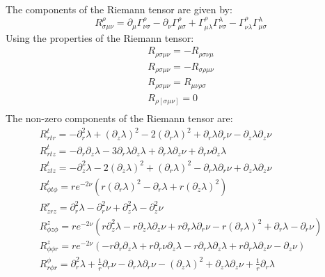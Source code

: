 \documentclass{article}
\begin{document}
The components of the Riemann tensor are given by:
\begin{equation}
R_{\sigma\mu\nu}^{\rho}=\partial_{\mu}\Gamma_{\nu\sigma}^{\rho}-\partial_{\nu}\Gamma_{\mu\sigma}^{\rho}+\Gamma_{\mu\lambda}^{\rho}\Gamma_{\nu\sigma}^{\lambda}-\Gamma_{\nu\lambda}^{\rho}\Gamma_{\mu\sigma}^{\lambda}
\end{equation}
Using the properties of the Riemann tensor:
\begin{equation}
\begin{array}{l}
R_{\rho\sigma\mu\nu}=-R_{\rho\sigma\nu\mu}\\
R_{\rho\sigma\mu\nu}=-R_{\sigma\rho\mu\nu}\\
R_{\rho\sigma\mu\nu}=R_{\mu\nu\rho\sigma}\\
R_{\rho[\sigma\mu\nu]}=0\\
\end{array}
\end{equation}
The non-zero components of the Riemann tensor are:
\begin{equation}
\begin{array}{l}
R^{t}_{rtr}=-\partial^{2}_{r}\lambda+\left(\partial_{z}\lambda\right)^{2}-2\left(\partial_{r}\lambda\right)^{2}+\partial_{r}\lambda\partial_{r}\nu-\partial_{z}\lambda\partial_{z}\nu\\
R^{t}_{rtz}=-\partial_{r}\partial_{z}\lambda-3\partial_{r}\lambda\partial_{z}\lambda+\partial_{r}\lambda\partial_{z}\nu+\partial_{r}\nu\partial_{z}\lambda\\
R^{t}_{ztz}=-\partial^{2}_{z}\lambda-2\left(\partial_{z}\lambda\right)^{2}+\left(\partial_{r}\lambda\right)^{2}-\partial_{r}\lambda\partial_{r}\nu+\partial_{z}\lambda\partial_{z}\nu\\
R^{t}_{\phi t\phi}=re^{-2\nu}\left(r\left(\partial_{r}\lambda\right)^{2}-\partial_{r}\lambda+r\left(\partial_{z}\lambda\right)^{2}\right)\\
R^{r}_{zrz}=\partial^{2}_{r}\lambda-\partial^{2}_{r}\nu+\partial^{2}_{z}\lambda-\partial^{2}_{z}\nu\\
R^{z}_{\phi z\phi}=re^{-2\nu}\left(r\partial^{2}_{z}\lambda-r\partial_{z}\lambda\partial_{z}\nu+r\partial_{r}\lambda\partial_{r}\nu-r\left(\partial_{r}\lambda\right)^{2}+\partial_{r}\lambda-\partial_{r}\nu\right)\\
R^{z}_{\phi\phi r}=re^{-2\nu}\left(-r\partial_{r}\partial_{z}\lambda+r\partial_{r}\nu\partial_{z}\lambda-r\partial_{r}\lambda\partial_{z}\lambda+r\partial_{r}\lambda\partial_{z}\nu-\partial_{z}\nu\right)\\
R^{\phi}_{r\phi r}=\partial^{2}_{r}\lambda+\frac{1}{r}\partial_{r}\nu-\partial_{r}\lambda\partial_{r}\nu-\left(\partial_{z}\lambda\right)^{2}+\partial_{z}\lambda\partial_{z}\nu+\frac{1}{r}\partial_{r}\lambda\\
\end{array}
\end{equation}
\end{document}
